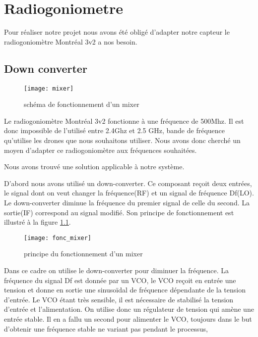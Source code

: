 
\chapter{Radiogoniometre}

Pour réaliser notre projet nous avons été obligé d'adapter notre capteur le radiogoniomètre Montréal 3v2 a nos besoin.

\section{Down converter}


\begin{wrapfigure}{r}{0.4\textwidth}
  
  \texttt{[image: mixer]}
  \caption{schéma de fonctionnement d'un mixer}
\end{wrapfigure}


Le radiogoniomètre Montréal 3v2 fonctionne à une fréquence de 500Mhz. Il est donc impossible de l’utilisé entre 2.4Ghz et 2.5 GHz, bande de fréquence qu’utilise les drones que nous souhaitons utiliser. Nous avons donc cherché un moyen d’adapter ce radiogoniomètre aux fréquences souhaitées.


Nous avons trouvé une solution applicable à notre système.

D’abord nous avons utilisé un down-converter. Ce composant reçoit deux entrées, le signal dont on veut changer la fréquence(RF) et un signal de fréquence Df(LO). Le down-converter diminue la fréquence du premier signal de celle du second. La sortie(IF) correspond au signal modifié. Son principe de fonctionnement est illustré à la figure \ref{fig:mix}.



\begin{figure}[h]
  \centering
  \texttt{[image: fonc\_mixer]}
  \caption{principe du fonctionnement d'un mixer}
  \label{fig:mix}
\end{figure}

Dans ce cadre on utilise le down-converter pour diminuer la fréquence.
La fréquence du signal Df est donnée par un VCO, le VCO reçoit en entrée une tension et donne en sortie une sinusoïdal de fréquence dépendante de la tension d’entrée. Le VCO étant très sensible, il est nécessaire de stabilisé la tension d’entrée et l’alimentation. On utilise donc un régulateur de tension qui amène une entrée stable. Il en a fallu un second pour alimenter le VCO, toujours dans le but d’obtenir une fréquence stable ne variant pas pendant le processus, 

